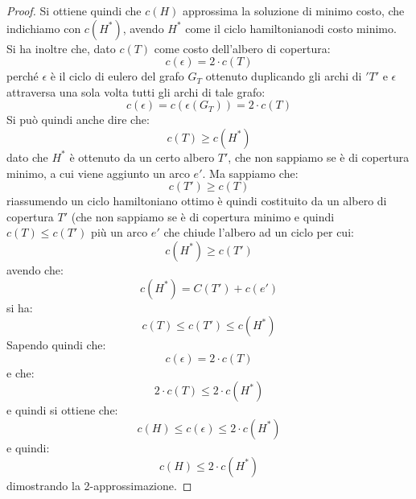 												      	\begin{proof}
												      		Si ottiene quindi che $c(H)$ approssima la soluzione di minimo costo, che
												      		indichiamo con $c(H^*)$, avendo $H^*$ come il ciclo hamiltonianodi costo
												      		minimo. \\
												      		Si ha inoltre che, dato $c(T)$ come costo dell'albero di copertura:
												      		\[c(\epsilon)=2\cdot c(T)\]
												      		perché $\epsilon$ è il ciclo di eulero del grafo $G_T$ ottenuto duplicando gli
												      		archi di $ 'T' $ e $\epsilon$ attraversa una sola volta tutti gli archi di tale
												      		grafo:
												      		\[c(\epsilon)=c(\epsilon(G_T))=2\cdot c(T)\]
												      		Si può quindi anche dire che:
												      		\[c(T)\geq c(H^*)\]
												      		dato che $H^*$ è ottenuto da un certo albero $T'$, che non sappiamo se è di
												      		copertura minimo, a cui viene aggiunto un arco $e'$.
												      		Ma sappiamo che:
												      		\[c(T')\geq c(T)\]
												      		riassumendo un ciclo hamiltoniano ottimo è quindi costituito da un albero di
												      		copertura $T'$ (che non sappiamo se è di copertura minimo e quindi $c(T)\leq
												      		c(T')$ più un arco $e'$ che chiude l'albero ad un ciclo per cui: 
												      		\[c(H^*)\geq c(T')\]
												      		avendo che:
												      		\[c(H^*)=C(T')+c(e')\]
												      		si ha:
												      		\[c(T)\leq c(T')\leq c(H^*)\]
												      		Sapendo quindi che:
												      		\[c(\epsilon)=2\cdot c(T)\]
												      		e che:
												      		\[2\cdot c(T)\leq 2\cdot c(H^*)\]
												      		e quindi si ottiene che:
												      		\[c(H)\leq c(\epsilon)\leq 2\cdot c(H^*)\]
												      		e quindi:
												      		\[c(H)\leq 2\cdot c(H^*)\]
												      		dimostrando la 2-approssimazione.
												      	\end{proof}
												      	
